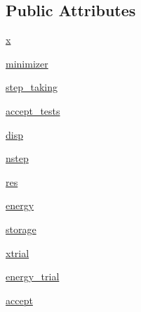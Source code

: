 \subsection*{Public Attributes}
\begin{DoxyCompactItemize}
\item 
\hyperlink{classscipy_1_1optimize_1_1__basinhopping_1_1BasinHoppingRunner_a0cedd1dcabb923cdd1dd0311017bf952}{x}
\item 
\hyperlink{classscipy_1_1optimize_1_1__basinhopping_1_1BasinHoppingRunner_a1b2912fd40092940be6d65c87e50b5eb}{minimizer}
\item 
\hyperlink{classscipy_1_1optimize_1_1__basinhopping_1_1BasinHoppingRunner_addc75a36cc905ebf4b97f7db8e3b2038}{step\+\_\+taking}
\item 
\hyperlink{classscipy_1_1optimize_1_1__basinhopping_1_1BasinHoppingRunner_a5aebee93b77f27602f75f9aec9c02d69}{accept\+\_\+tests}
\item 
\hyperlink{classscipy_1_1optimize_1_1__basinhopping_1_1BasinHoppingRunner_a38498b8dd7adb0aa35bffd6c48cc85ce}{disp}
\item 
\hyperlink{classscipy_1_1optimize_1_1__basinhopping_1_1BasinHoppingRunner_ac0ee5f2ac66dd7d1499761c1c3510a14}{nstep}
\item 
\hyperlink{classscipy_1_1optimize_1_1__basinhopping_1_1BasinHoppingRunner_af12798c5465d35cc67dbac54b4fdf6bc}{res}
\item 
\hyperlink{classscipy_1_1optimize_1_1__basinhopping_1_1BasinHoppingRunner_a95695f7d5397a85840eeafa9bc940927}{energy}
\item 
\hyperlink{classscipy_1_1optimize_1_1__basinhopping_1_1BasinHoppingRunner_a5f3413a307aa2be3fdbe2fc42f43f215}{storage}
\item 
\hyperlink{classscipy_1_1optimize_1_1__basinhopping_1_1BasinHoppingRunner_ac3f512962103da46e1e2859ebc40ad1f}{xtrial}
\item 
\hyperlink{classscipy_1_1optimize_1_1__basinhopping_1_1BasinHoppingRunner_ae126fac59c3f43975b1c534650eb65ba}{energy\+\_\+trial}
\item 
\hyperlink{classscipy_1_1optimize_1_1__basinhopping_1_1BasinHoppingRunner_aab55ad72469a157cdd18089e209bf9de}{accept}
\end{DoxyCompactItemize}


